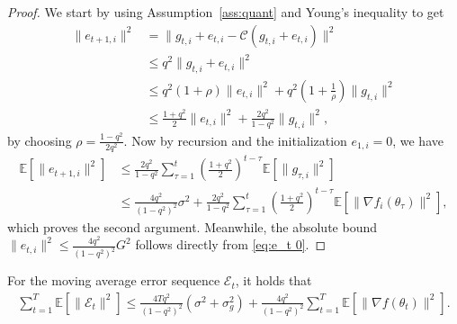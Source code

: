 \documentclass[11pt]{article}
\begin{document}
\begin{proof}
We start by using Assumption~\ref{ass:quant} and Young's inequality to get
\begin{align}
    \|e_{t+1,i}\|^2&=\|g_{t,i}+e_{t,i}-\mathcal C(g_{t,i}+e_{t,i})\|^2 \nonumber\\
    &\leq q^2\|g_{t,i}+e_{t,i}\|^2 \nonumber\\
    &\leq q^2(1+\rho)\|e_{t,i}\|^2+q^2(1+\frac{1}{\rho})\|g_{t,i}\|^2 \nonumber\\
    &\leq \frac{1+q^2}{2}\|e_{t,i}\|^2 + \frac{2q^2}{1-q^2}\|g_{t,i}\|^2, \label{eq:e_t 0}
\end{align}
by choosing $\rho=\frac{1-q^2}{2q^2}$. Now by recursion and the initialization $e_{1,i}=0$, we have
\begin{align*}
    \mathbb E[\|e_{t+1,i}\|^2]&\leq \frac{2q^2}{1-q^2} \sum_{\tau=1}^t (\frac{1+q^2}{2})^{t-\tau} \mathbb E[\|g_{\tau,i}\|^2]  \\
    &\leq \frac{4q^2}{(1-q^2)^2}\sigma^2 + \frac{2q^2}{1-q^2}\sum_{\tau=1}^t (\frac{1+q^2}{2})^{t-\tau} \mathbb E[\|\nabla f_i(\theta_{\tau})\|^2], \nonumber
\end{align*}
which proves the second argument. Meanwhile, the absolute bound $\|e_{t,i}\|^2\leq \frac{4q^2}{(1-q^2)^2}G^2$ follows directly from \eqref{eq:e_t 0}.
\end{proof}

\begin{Lemma} \label{lemma:bound big E_t}
For the moving average error sequence $\mathcal E_t$, it holds that
\begin{align*}
    \sum_{t=1}^T \mathbb E[\|\mathcal E_t\|^2]\leq \frac{4Tq^2}{(1-q^2)^2}(\sigma^2+\sigma_g^2) + \frac{4q^2}{(1-q^2)^2} \sum_{t=1}^T \mathbb E[\|\nabla f(\theta_t)\|^2 ].
\end{align*}
\end{Lemma}
\end{document}
